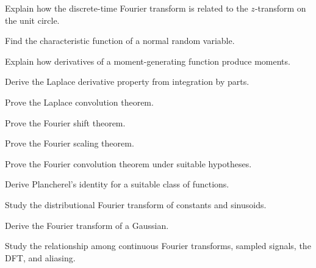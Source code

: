 \begin{exercise}[3]
Explain how the discrete-time Fourier transform is related to the
\(z\)-transform on the unit circle.
\end{exercise}

\begin{exercise}[3]
Find the characteristic function of a normal random variable.
\end{exercise}

\begin{exercise}[3]
Explain how derivatives of a moment-generating function produce moments.
\end{exercise}

\begin{exercise}[4]
Derive the Laplace derivative property from integration by parts.
\end{exercise}

\begin{exercise}[4]
Prove the Laplace convolution theorem.
\end{exercise}

\begin{exercise}[4]
Prove the Fourier shift theorem.
\end{exercise}

\begin{exercise}[4]
Prove the Fourier scaling theorem.
\end{exercise}

\begin{exercise}[4]
Prove the Fourier convolution theorem under suitable hypotheses.
\end{exercise}

\begin{exercise}[4]
Derive Plancherel's identity for a suitable class of functions.
\end{exercise}

\begin{exercise}[4]
Study the distributional Fourier transform of constants and sinusoids.
\end{exercise}

\begin{exercise}[4]
Derive the Fourier transform of a Gaussian.
\end{exercise}

\begin{exercise}[4]
Study the relationship among continuous Fourier transforms, sampled signals,
the DFT, and aliasing.
\end{exercise}

